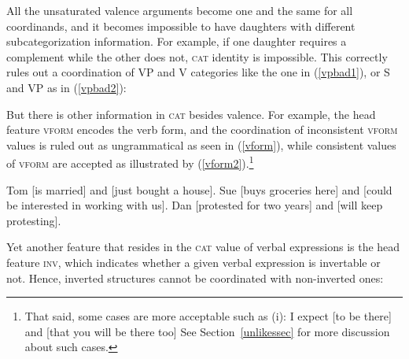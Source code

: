 {All the unsaturated valence arguments become one and the same for all coordinands, and it becomes impossible to have daughters with different subcategorization information. For example, if one daughter requires a complement while the other does not,
\textsc{cat} identity  is impossible. This correctly rules out  a coordination of  VP and V categories
like the one in (\ref{vpbad1}), or S and VP as in (\ref{vpbad2}):

\eal
{}\label{vpbad1}
\label{vpbad2}
\zl

But there is other information in \textsc{cat} besides valence. For example, the head feature
\textsc{vform} encodes the verb form, and the coordination of inconsistent \textsc{vform} values is
ruled out as ungrammatical as seen in (\ref{vform}), while consistent values of \textsc{vform} are
accepted as illustrated by (\ref{vform2}).\footnote{%
That said, some cases are more acceptable such as (i):
\ea
I expect [to be there] and [that you will be there too]
\z
See Section~\ref{unlikessec} for more discussion about such cases.}


\eal
\label{vform}
\zl



\eal
\label{vform2}
\ex Tom [is married] and [just bought  a house].
\ex Sue [buys groceries here] and [could be interested in working with us].
\ex Dan [protested for two years] and [will keep protesting].
\zl

Yet another feature that resides in the \textsc{cat} value of verbal expressions is the head feature \textsc{inv}, which indicates whether a given verbal expression is invertable or not. Hence, inverted structures cannot be coordinated with non-inverted ones:


\eal
{}
\ex[*] {[Sue has sung in public]\sub{\inv $-$} and [has Kim tap-danced\sub{\inv $+$}.}
\zl

\eal
{}
\zl

}
